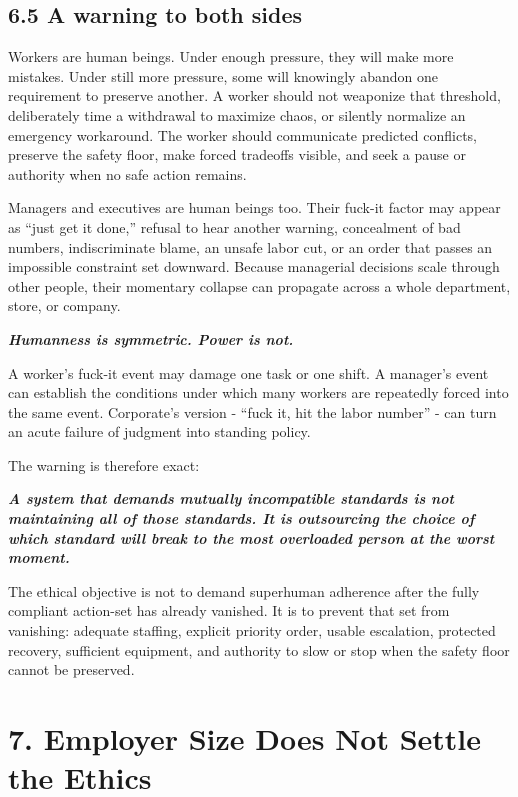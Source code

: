 \documentclass[11pt,oneside]{article}
\renewenvironment{quote}
  {\begin{tcolorbox}[
      enhanced,
      breakable,
      colback=ManifestLight,
      colframe=ManifestRule,
      boxrule=0pt,
      leftrule=3pt,
      arc=0pt,
      outer arc=0pt,
      left=10pt,right=10pt,top=8pt,bottom=8pt,
      before skip=0.8em,after skip=0.8em
    ]\itshape}
  {\end{tcolorbox}}
\begin{document}
\subsection{6.5 A warning to both sides}\label{a-warning-to-both-sides}

Workers are human beings. Under enough pressure, they will make more
mistakes. Under still more pressure, some will knowingly abandon one
requirement to preserve another. A worker should not weaponize that
threshold, deliberately time a withdrawal to maximize chaos, or silently
normalize an emergency workaround. The worker should communicate
predicted conflicts, preserve the safety floor, make forced tradeoffs
visible, and seek a pause or authority when no safe action remains.

Managers and executives are human beings too. Their fuck-it factor may
appear as ``just get it done,'' refusal to hear another warning,
concealment of bad numbers, indiscriminate blame, an unsafe labor cut,
or an order that passes an impossible constraint set downward. Because
managerial decisions scale through other people, their momentary
collapse can propagate across a whole department, store, or company.

\begin{quote}
\textbf{Humanness is symmetric. Power is not.}
\end{quote}

A worker's fuck-it event may damage one task or one shift. A manager's
event can establish the conditions under which many workers are
repeatedly forced into the same event. Corporate's version - ``fuck it,
hit the labor number'' - can turn an acute failure of judgment into
standing policy.

The warning is therefore exact:

\begin{quote}
\textbf{A system that demands mutually incompatible standards is not
maintaining all of those standards. It is outsourcing the choice of
which standard will break to the most overloaded person at the worst
moment.}
\end{quote}

The ethical objective is not to demand superhuman adherence after the
fully compliant action-set has already vanished. It is to prevent that
set from vanishing: adequate staffing, explicit priority order, usable
escalation, protected recovery, sufficient equipment, and authority to
slow or stop when the safety floor cannot be preserved.

\section{7. Employer Size Does Not Settle the
Ethics}\label{employer-size-does-not-settle-the-ethics}
\end{document}
